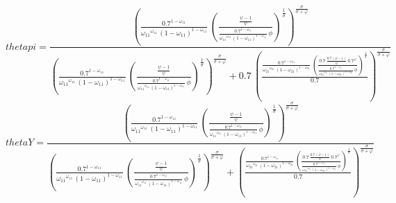 \begin{dmath*}
thetapi = \frac{\left(\frac{0.7^{1-{{\omega_{11}}}}}{{{\omega_{11}}}^{{{\omega_{11}}}}\, \left(1-{{\omega_{11}}}\right)^{1-{{\omega_{11}}}}}\, \left(\frac{\frac{{{\psi}}-1}{{{\psi}}}}{\frac{0.7^{1-{{\omega_{11}}}}}{{{\omega_{11}}}^{{{\omega_{11}}}}\, \left(1-{{\omega_{11}}}\right)^{1-{{\omega_{11}}}}}\, {{\phi}}}\right)^{\frac{1}{{{\sigma}}}}\right)^{\frac{{{\sigma}}}{{{\sigma}}+{{\varphi}}}}}{\left(\frac{0.7^{1-{{\omega_{11}}}}}{{{\omega_{11}}}^{{{\omega_{11}}}}\, \left(1-{{\omega_{11}}}\right)^{1-{{\omega_{11}}}}}\, \left(\frac{\frac{{{\psi}}-1}{{{\psi}}}}{\frac{0.7^{1-{{\omega_{11}}}}}{{{\omega_{11}}}^{{{\omega_{11}}}}\, \left(1-{{\omega_{11}}}\right)^{1-{{\omega_{11}}}}}\, {{\phi}}}\right)^{\frac{1}{{{\sigma}}}}\right)^{\frac{{{\sigma}}}{{{\sigma}}+{{\varphi}}}}+0.7\, \left(\frac{\frac{0.7^{1-{{\omega_{11}}}}}{{{\omega_{21}}}^{{{\omega_{21}}}}\, \left(1-{{\omega_{21}}}\right)^{1-{{\omega_{21}}}}}\, \left(\frac{0.7\, \frac{0.7\, \left({{\psi}}-1\right)}{{{\psi}}}\, 0.7^{{{\varphi}}}}{\frac{0.7^{1-{{\omega_{11}}}}}{{{\omega_{21}}}^{{{\omega_{21}}}}\, \left(1-{{\omega_{21}}}\right)^{1-{{\omega_{21}}}}}\, {{\phi}}}\right)^{\frac{1}{{{\sigma}}}}}{0.7}\right)^{\frac{{{\sigma}}}{{{\sigma}}+{{\varphi}}}}}
\end{dmath*}
\begin{dmath*}
thetaY = \frac{\left(\frac{0.7^{1-{{\omega_{11}}}}}{{{\omega_{11}}}^{{{\omega_{11}}}}\, \left(1-{{\omega_{11}}}\right)^{1-{{\omega_{11}}}}}\, \left(\frac{\frac{{{\psi}}-1}{{{\psi}}}}{\frac{0.7^{1-{{\omega_{11}}}}}{{{\omega_{11}}}^{{{\omega_{11}}}}\, \left(1-{{\omega_{11}}}\right)^{1-{{\omega_{11}}}}}\, {{\phi}}}\right)^{\frac{1}{{{\sigma}}}}\right)^{\frac{{{\sigma}}}{{{\sigma}}+{{\varphi}}}}}{\left(\frac{0.7^{1-{{\omega_{11}}}}}{{{\omega_{11}}}^{{{\omega_{11}}}}\, \left(1-{{\omega_{11}}}\right)^{1-{{\omega_{11}}}}}\, \left(\frac{\frac{{{\psi}}-1}{{{\psi}}}}{\frac{0.7^{1-{{\omega_{11}}}}}{{{\omega_{11}}}^{{{\omega_{11}}}}\, \left(1-{{\omega_{11}}}\right)^{1-{{\omega_{11}}}}}\, {{\phi}}}\right)^{\frac{1}{{{\sigma}}}}\right)^{\frac{{{\sigma}}}{{{\sigma}}+{{\varphi}}}}+\left(\frac{\frac{0.7^{1-{{\omega_{11}}}}}{{{\omega_{21}}}^{{{\omega_{21}}}}\, \left(1-{{\omega_{21}}}\right)^{1-{{\omega_{21}}}}}\, \left(\frac{0.7\, \frac{0.7\, \left({{\psi}}-1\right)}{{{\psi}}}\, 0.7^{{{\varphi}}}}{\frac{0.7^{1-{{\omega_{11}}}}}{{{\omega_{21}}}^{{{\omega_{21}}}}\, \left(1-{{\omega_{21}}}\right)^{1-{{\omega_{21}}}}}\, {{\phi}}}\right)^{\frac{1}{{{\sigma}}}}}{0.7}\right)^{\frac{{{\sigma}}}{{{\sigma}}+{{\varphi}}}}}
\end{dmath*}
